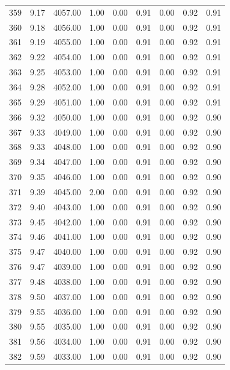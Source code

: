 \documentclass{article}\usepackage[]{graphicx}\usepackage[]{color}
\begin{document}
\begin{longtable}{rrrrrrrrr}
  359 & 9.17 & 4057.00 & 1.00 & 0.00 & 0.91 & 0.00 & 0.92 & 0.91 \\ 
  360 & 9.18 & 4056.00 & 1.00 & 0.00 & 0.91 & 0.00 & 0.92 & 0.91 \\ 
  361 & 9.19 & 4055.00 & 1.00 & 0.00 & 0.91 & 0.00 & 0.92 & 0.91 \\ 
  362 & 9.22 & 4054.00 & 1.00 & 0.00 & 0.91 & 0.00 & 0.92 & 0.91 \\ 
  363 & 9.25 & 4053.00 & 1.00 & 0.00 & 0.91 & 0.00 & 0.92 & 0.91 \\ 
  364 & 9.28 & 4052.00 & 1.00 & 0.00 & 0.91 & 0.00 & 0.92 & 0.91 \\ 
  365 & 9.29 & 4051.00 & 1.00 & 0.00 & 0.91 & 0.00 & 0.92 & 0.91 \\ 
  366 & 9.32 & 4050.00 & 1.00 & 0.00 & 0.91 & 0.00 & 0.92 & 0.90 \\ 
  367 & 9.33 & 4049.00 & 1.00 & 0.00 & 0.91 & 0.00 & 0.92 & 0.90 \\ 
  368 & 9.33 & 4048.00 & 1.00 & 0.00 & 0.91 & 0.00 & 0.92 & 0.90 \\ 
  369 & 9.34 & 4047.00 & 1.00 & 0.00 & 0.91 & 0.00 & 0.92 & 0.90 \\ 
  370 & 9.35 & 4046.00 & 1.00 & 0.00 & 0.91 & 0.00 & 0.92 & 0.90 \\ 
  371 & 9.39 & 4045.00 & 2.00 & 0.00 & 0.91 & 0.00 & 0.92 & 0.90 \\ 
  372 & 9.40 & 4043.00 & 1.00 & 0.00 & 0.91 & 0.00 & 0.92 & 0.90 \\ 
  373 & 9.45 & 4042.00 & 1.00 & 0.00 & 0.91 & 0.00 & 0.92 & 0.90 \\ 
  374 & 9.46 & 4041.00 & 1.00 & 0.00 & 0.91 & 0.00 & 0.92 & 0.90 \\ 
  375 & 9.47 & 4040.00 & 1.00 & 0.00 & 0.91 & 0.00 & 0.92 & 0.90 \\ 
  376 & 9.47 & 4039.00 & 1.00 & 0.00 & 0.91 & 0.00 & 0.92 & 0.90 \\ 
  377 & 9.48 & 4038.00 & 1.00 & 0.00 & 0.91 & 0.00 & 0.92 & 0.90 \\ 
  378 & 9.50 & 4037.00 & 1.00 & 0.00 & 0.91 & 0.00 & 0.92 & 0.90 \\ 
  379 & 9.55 & 4036.00 & 1.00 & 0.00 & 0.91 & 0.00 & 0.92 & 0.90 \\ 
  380 & 9.55 & 4035.00 & 1.00 & 0.00 & 0.91 & 0.00 & 0.92 & 0.90 \\ 
  381 & 9.56 & 4034.00 & 1.00 & 0.00 & 0.91 & 0.00 & 0.92 & 0.90 \\ 
  382 & 9.59 & 4033.00 & 1.00 & 0.00 & 0.91 & 0.00 & 0.92 & 0.90 \\ 

\end{longtable}
\end{document}
